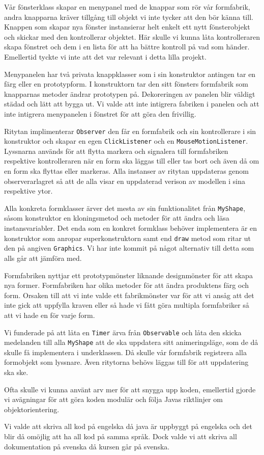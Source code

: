 \documentclass[a4paper,8pt]{article}
\begin{document}
Vår fönsterklass skapar en menypanel med de knappar som rör vår formfabrik, 
andra knapparna kräver tillgång till objekt vi inte tycker att den bör 
känna till. Knappen som skapar nya fönster instansierar helt enkelt ett nytt
fönsterobjekt och skickar med den kontrollerar objektet. Här skulle vi kunna
låta kontrolleraren skapa fönstret och dem i en lista för att ha bättre 
kontroll på vad som händer. Emellertid tyckte vi inte att det var relevant i 
detta lilla projekt.

Menypanelen har två privata knappklasser som i sin konstruktor antingen
tar en färg eller en prototypform. I konstruktorn tar den sitt fönsters 
formfabrik som knapparnas metoder ändrar prototypen på. Dekoreringen av panelen
blir väldigt städad och lätt att bygga ut. Vi valde att inte intigrera fabriken
i panelen och att inte intigrera menypanelen i fönstret för att göra den
frivillig.

Ritytan implimenterar \texttt{Observer} den får en formfabrik och sin 
kontrollerare i sin konstruktor och skapar en egen \texttt{ClickListener} och
en \texttt{MouseMotionListener}. Lyssnarna används för att flytta markera och
signalera till formfabriken respektive kontrolleraren när en form ska läggas 
till eller tas bort och även då om en form ska flyttas eller markeras.
Alla instanser av ritytan uppdateras genom observerarlagret så att de alla
visar en uppdaterad verison av modellen i sina respektive ytor.

Alla konkreta formklasser ärver det mesta av sin funktionalitet från 
\texttt{MyShape}, såsom konstruktor en kloningsmetod och metoder för att 
ändra och läsa instansvariabler. Det enda som en konkret formklass behöver 
implementera är en konstruktor som anropar superkonstruktorn samt end 
\texttt{draw} metod som ritar ut den på angiven \texttt{Graphics}. Vi har inte 
kommit på något alternativ till detta som alls går att jämföra med.

Formfabriken nyttjar ett prototypmönster liknande designmönster
för att skapa nya former. Formfabriken har olika metoder för att ändra
produktens färg och form. Orsaken till att vi inte valde ett fabrikmönster
var för att vi ansåg att det inte gick att uppfylla kraven eller så 
hade vi fått göra multipla formfabriker så att vi hade en för varje form.

Vi funderade på att låta en \texttt{Timer} ärva från \texttt{Observable} och
låta den skicka medelanden till alla \texttt{MyShape} att de ska uppdatera sitt
animeringsläge, som de då skulle få implementera i underklassen. Då skulle vår
formfabrik registrera alla formobjekt som lyssnare. Även ritytorna behövs läggas
till för att uppdatering ska ske.

Ofta skulle vi kunna använt arv mer för att snygga upp koden, emellertid 
gjorde vi avägningar för att göra koden modulär och följa Javas riktlinjer om
objektorientering.

Vi valde att skriva all kod på engelska då java är uppbyggt på engelska och det
blir då omöjlig att ha all kod på samma språk. Dock valde vi att skriva all
dokumentation på svenska då kursen går på svenska.
\end{document}
